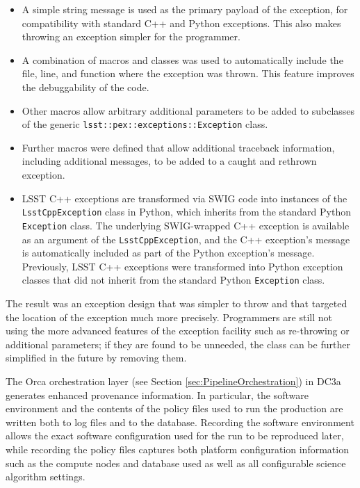 \begin{itemize}

\item A simple string message is used as the primary payload of the
exception, for compatibility with standard C++ and Python exceptions.
This also makes throwing an exception simpler for the programmer.

\item A combination of macros and classes was used to automatically
include the file, line, and function where the exception was thrown.
This feature improves the debuggability of the code.

\item Other macros allow arbitrary additional parameters to be added to
subclasses of the generic {\tt lsst::pex::exceptions::Exception} class.

\item Further macros were defined that allow additional traceback
information, including additional messages, to be added to a caught and
rethrown exception.

\item LSST C++ exceptions are transformed via SWIG code into instances
of the {\tt LsstCppException} class in Python, which inherits from the
standard Python {\tt Exception} class.  The underlying SWIG-wrapped C++
exception is available as an argument of the {\tt LsstCppException}, and
the C++ exception's message is automatically included as part of the
Python exception's message.  Previously, LSST C++ exceptions were
transformed into Python exception classes that did not inherit from the
standard Python {\tt Exception} class.

\end{itemize}

The result was an exception design that was simpler to throw and that
targeted the location of the exception much more precisely.  Programmers
are still not using the more advanced features of the exception facility
such as re-throwing or additional parameters; if they are found to be
unneeded, the class can be further simplified in the future by removing
them.



The Orca orchestration layer (see Section
\ref{sec:PipelineOrchestration}) in DC3a generates enhanced provenance
information.  In particular, the software environment and the contents
of the policy files used to run the production are written both to log
files and to the database.  Recording the software environment allows
the exact software configuration used for the run to be reproduced
later, while recording the policy files captures both platform
configuration information such as the compute nodes and database used as
well as all configurable science algorithm settings.

